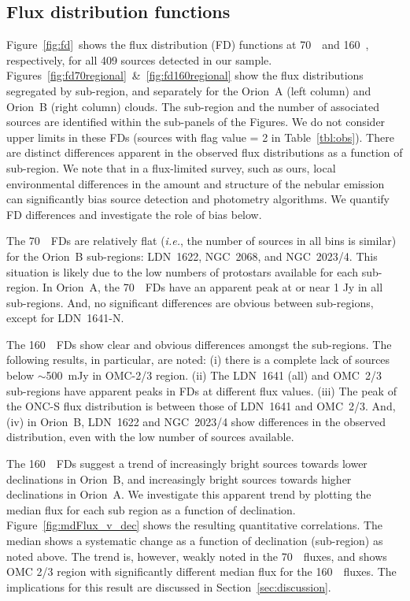 \documentclass[manuscript]{aastex}
\newcommand{\ie}{{\em i.e.}}
\begin{document}
\subsection{Flux distribution functions}
\label{lfs}
\par
Figure~\ref{fig:fd}\ shows the flux distribution (FD) functions at 70~\micron\ and 160~\micron, respectively, for all 409 sources detected in our sample.  Figures~\ref{fig:fd70regional}~\&~\ref{fig:fd160regional} show the flux distributions segregated by sub-region, and separately for the Orion~A (left column) and Orion~B (right column) clouds.  The sub-region and the number of associated sources are identified within the sub-panels of the Figures.  We do not consider upper limits in these FDs (sources with flag value = 2 in Table~\ref{tbl:obs}). There are distinct differences apparent in the observed flux distributions as a function of sub-region.  We note that in a flux-limited survey, such as ours, local environmental differences in the amount and structure of the nebular emission can significantly bias source detection and photometry algorithms.  We quantify FD differences and investigate the role of bias below.
\par
The 70~\micron\ FDs are relatively flat (\ie, the number of sources in all bins is similar) for the Orion~B sub-regions: LDN~1622, NGC~2068, and NGC~2023/4.  This situation is likely due to the low numbers of protostars available for each sub-region.  In Orion~A, the 70~\micron\ FDs have an apparent peak at or near 1 Jy in all sub-regions.  And, no significant differences are obvious between sub-regions, except for LDN~1641-N.
\par
The 160~\micron\ FDs show clear and obvious differences amongst the sub-regions.  The following results, in particular, are noted: (i) there is a complete lack of sources below $\sim$500~mJy in OMC-2/3 region.  (ii) The LDN~1641 (all) and OMC~2/3 sub-regions have apparent peaks in FDs at different flux values.  (iii) The peak of the ONC-S flux distribution is between those of LDN~1641 and OMC~2/3.  And, (iv) in Orion~B, LDN~1622 and NGC~2023/4 show differences in the observed distribution, even with the low number of sources available.
\par
The 160~\micron\ FDs suggest a trend of increasingly bright sources towards lower declinations in Orion~B, and increasingly bright sources towards higher declinations in Orion~A.  We investigate this apparent trend by plotting the median flux for each sub region as a function of declination.  Figure~\ref{fig:mdFlux_v_dec} shows the resulting quantitative correlations.  The median shows a systematic change as a function of declination (sub-region) as noted above.  The trend is, however, weakly noted in the 70~\micron\ fluxes, and shows OMC 2/3 region with significantly different median flux for the 160~\micron\ fluxes.  The implications for this result are discussed in Section~\ref{sec:discussion}.
\end{document}
